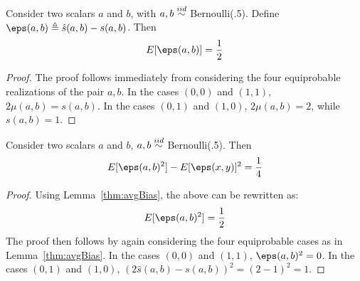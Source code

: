 \begin{lemma} \label{thm:avgBias}
Consider two scalars $a$ and $b$, with $a, b \stackrel{iid}{\sim}$ Bernoulli(.5). Define $\eps(a, b) \triangleq \hat{s}(a, b) - s(a, b)$. Then
\[
    E[\eps(a, b)] = \frac{1}{2}
\]
\end{lemma}
\begin{proof} The proof follows immediately from considering the four equiprobable realizations of the pair $a, b$. In the cases $(0, 0)$ and $(1, 1)$, $2\mu(a, b) = s(a, b)$. In the cases $(0, 1)$ and $(1, 0)$, $2 \mu(a, b) = 2$, while $s(a, b) = 1$.
\end{proof}





\begin{lemma}
Consider two scalars $a$ and $b$, $a, b \stackrel{iid}{\sim}$ Bernoulli(.5). Then
\[
    E[\eps(a, b)^2] - E[\eps(x, y)]^2 = \frac{1}{4}
\]
\end{lemma}
\begin{proof} Using Lemma~\ref{thm:avgBias}, the above can be rewritten as:
\[
    E[\eps(a, b)^2] = \frac{1}{2}
\]
The proof then follows by again considering the four equiprobable cases as in Lemma~\ref{thm:avgBias}. In the cases $(0, 0)$ and $(1, 1)$, $\eps(a, b)^2 = 0$. In the cases $(0, 1)$ and $(1, 0)$, $(2 \hat{s}(a, b) - s(a, b))^2 = (2 - 1)^2 = 1$.
\end{proof}




